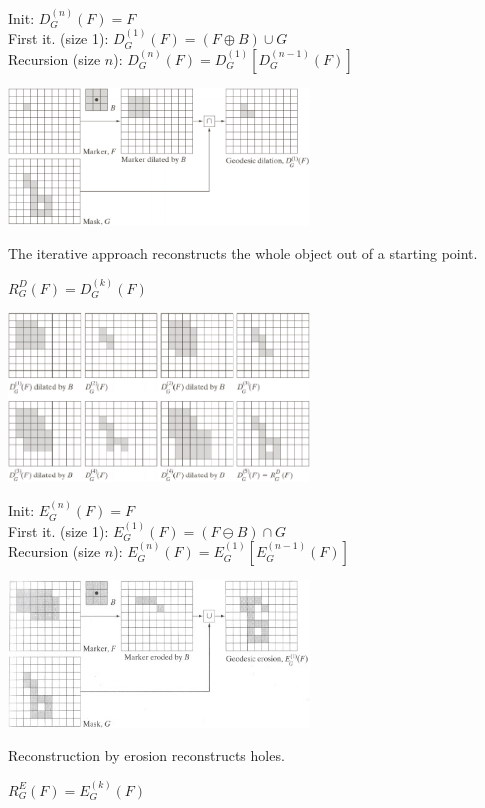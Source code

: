   \begin{minipage}{9.2cm}
      Init: $D_G^{(n)}(F)=F$ \\
      First it. (size 1): $D_G^{(1)}(F) = (F \oplus B) \cup G$\\
      Recursion (size $n$): $D_G^{(n)}(F) = D_G^{(1)}[D_G^{(n-1)}(F)]$
      
      \includegraphics[width=8cm]{./images/morphology_geodesic_dilation.png}
      
      The iterative approach reconstructs the whole object out of a starting point.
      
      $R_G^D(F) = D_G^{(k)}(F)$
      
      \includegraphics[width=8cm]{./images/morphology_reconstruction_dilation.png}
  \end{minipage}
  \begin{minipage}{9.2cm}
      Init: $E_G^{(n)}(F)=F$ \\
      First it. (size 1): $E_G^{(1)}(F) = (F \ominus B) \cap G$\\
      Recursion (size $n$): $E_G^{(n)}(F) = E_G^{(1)}[E_G^{(n-1)}(F)]$
        
      \includegraphics[width=8cm]{./images/morphology_geodesic_erosion.jpg}
      
      Reconstruction by erosion reconstructs holes.
      
      $R_G^E(F) = E_G^{(k)}(F)$
  \end{minipage}
  
